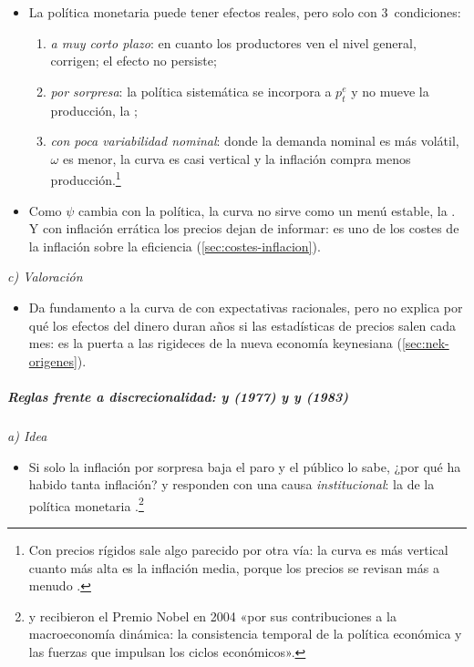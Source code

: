 \documentclass[11pt]{article}
\begin{document}
\begin{itemize}
\item La política monetaria puede tener efectos reales, pero solo con 3~condiciones:
  \begin{enumerate}
  \item \emph{a muy corto plazo}: en cuanto los productores ven el nivel general, corrigen; el efecto no persiste;
  \item \emph{por sorpresa}: la política sistemática se incorpora a $p^e_t$ y no mueve la producción, la \nocite{SargentWallace1975Rational};
  \item \emph{con poca variabilidad nominal}: donde la demanda nominal es más volátil, $\omega$ es menor, la curva es casi vertical y la inflación compra menos producción\nocite{Lucas1973Some}.\footnote{Con precios rígidos sale algo parecido por otra vía: la curva es más vertical cuanto más alta es la inflación media, porque los precios se revisan más a menudo\nocite{BallMankiwRomer1988} .}
  \end{enumerate}
\item Como $\psi$ cambia con la política, la curva no sirve como un menú estable, la  . Y con inflación errática los precios dejan de informar: es uno de los costes de la inflación sobre la eficiencia (\ref{sec:costes-inflacion}).
\end{itemize}

\hspace*{4.8em}\emph{c) Valoración}

\begin{itemize}
\item Da fundamento a la curva de  con expectativas racionales, pero no explica por qué los efectos del dinero duran años si las estadísticas de precios salen cada mes: es la puerta a las rigideces de la nueva economía keynesiana (\ref{sec:nek-origenes}).
\end{itemize}

\subparagraph{Reglas frente a discrecionalidad:  y  (1977) y  y  (1983)}

\hspace*{4.8em}\emph{a) Idea}

\begin{itemize}
\item Si solo la inflación por sorpresa baja el paro y el público lo sabe, ¿por qué ha habido tanta inflación? \textcite{KydlandPrescott1977Rules} y \textcite{BarroGordon1983Positive} responden con una causa \emph{institucional}: la  de la política monetaria  .\footnote{ y  recibieron el Premio Nobel en 2004 «por sus contribuciones a la macroeconomía dinámica: la consistencia temporal de la política económica y las fuerzas que impulsan los ciclos económicos»\nocite{Nobel2004KydlandPrescott}.}
\end{itemize}
\end{document}
